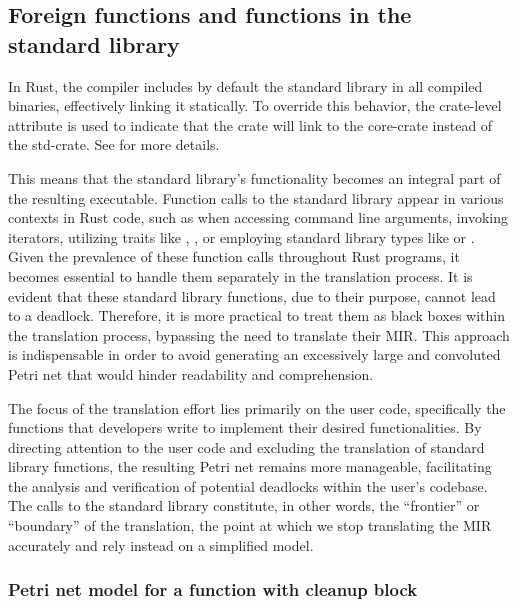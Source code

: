 \subsection{Foreign functions and functions in the standard library}

In Rust, the compiler includes by default
the standard library in all compiled binaries, effectively linking it statically.
To override this behavior, the crate-level attribute \Rustinline{#![no_std]}
is used to indicate that the crate will link to the core-crate instead of the std-crate.
See \cite{embedded-book} for more details.

This means that the standard library's functionality becomes an integral part of the resulting executable.
Function calls to the standard library appear in various contexts in Rust code,
such as when accessing command line arguments, invoking iterators,
utilizing traits like , ,
or employing standard library types like  or .
Given the prevalence of these function calls throughout Rust programs,
it becomes essential to handle them separately in the translation process.
It is evident that these standard library functions, due to their purpose, cannot lead to a deadlock.
Therefore, it is more practical to treat them as black boxes within the translation process,
bypassing the need to translate their \acrshort{MIR}.
This approach is indispensable in order to avoid generating
an excessively large and convoluted Petri net that would hinder readability and comprehension.

The focus of the translation effort lies primarily on the user code, specifically
the functions that developers write to implement their desired functionalities.
By directing attention to the user code and excluding the translation of standard library functions,
the resulting Petri net remains more manageable,
facilitating the analysis and verification of potential deadlocks within the user's codebase.
The calls to the standard library constitute, in other words,
the ``frontier'' or ``boundary'' of the translation,
the point at which we stop translating the \acrshort{MIR} accurately
and rely instead on a simplified model.

\subsubsection{Petri net model for a function with cleanup block}

